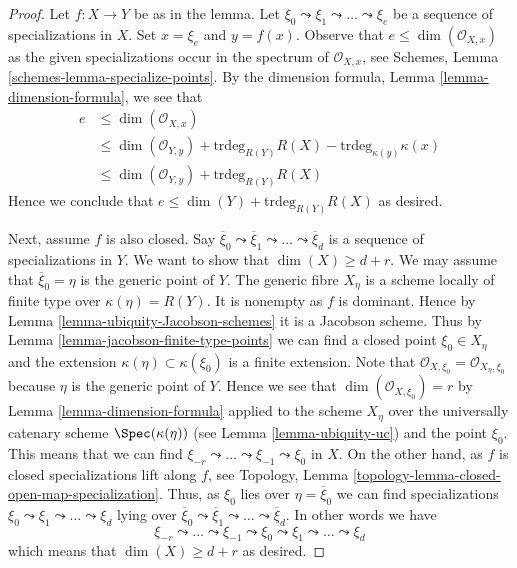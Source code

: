 \begin{proof}
Let $f : X \to Y$ be as in the lemma.
Let $\xi_0 \leadsto \xi_1 \leadsto \ldots \leadsto \xi_e$ be
a sequence of specializations in $X$. Set $x = \xi_e$
and $y = f(x)$. Observe that $e \leq \dim(\mathcal{O}_{X, x})$
as the given specializations occur in the spectrum of
$\mathcal{O}_{X, x}$, see Schemes, Lemma \ref{schemes-lemma-specialize-points}.
By the dimension formula, Lemma \ref{lemma-dimension-formula},
we see that
\begin{align*}
e & \leq \dim(\mathcal{O}_{X, x}) \\
& \leq \dim(\mathcal{O}_{Y, y}) +
\text{trdeg}_{R(Y)} R(X) - \text{trdeg}_{\kappa(y)} \kappa(x) \\
& \leq \dim(\mathcal{O}_{Y, y}) + \text{trdeg}_{R(Y)} R(X)
\end{align*}
Hence we conclude that $e \leq \dim(Y) + \text{trdeg}_{R(Y)} R(X)$ as desired.

\medskip\noindent
Next, assume $f$ is also closed.
Say $\overline{\xi}_0 \leadsto \overline{\xi}_1 \leadsto \ldots
\leadsto \overline{\xi}_d$ is a sequence of specializations in $Y$.
We want to show that $\dim(X) \geq d + r$.
We may assume that $\overline{\xi}_0 = \eta$ is the generic point of $Y$.
The generic fibre $X_\eta$ is a scheme locally of finite type over
$\kappa(\eta) = R(Y)$. It is nonempty as $f$ is dominant. Hence by
Lemma \ref{lemma-ubiquity-Jacobson-schemes} it is a Jacobson scheme.
Thus by Lemma \ref{lemma-jacobson-finite-type-points}
we can find a closed point $\xi_0 \in X_\eta$ and the extension
$\kappa(\eta) \subset \kappa(\xi_0)$ is
a finite extension. Note that
$\mathcal{O}_{X, \xi_0} = \mathcal{O}_{X_\eta, \xi_0}$ because
$\eta$ is the generic point of $Y$. Hence we see that
$\dim(\mathcal{O}_{X, \xi_0}) = r$ by Lemma \ref{lemma-dimension-formula}
applied to the scheme $X_\eta$ over the universally catenary
scheme $\Spec(\kappa(\eta))$ (see Lemma \ref{lemma-ubiquity-uc})
and the point $\xi_0$. This means that we can find
$\xi_{-r} \leadsto \ldots \leadsto \xi_{-1} \leadsto \xi_0$
in $X$. On the other hand, as $f$ is closed specializations
lift along $f$, see
Topology, Lemma \ref{topology-lemma-closed-open-map-specialization}.
Thus, as $\xi_0$ lies
over $\eta = \overline{\xi}_0$ we can
find specializations $\xi_0 \leadsto \xi_1 \leadsto \ldots \leadsto \xi_d$
lying over $\overline{\xi}_0 \leadsto \overline{\xi}_1 \leadsto \ldots
\leadsto \overline{\xi}_d$. In other words we have
$$
\xi_{-r} \leadsto \ldots \leadsto \xi_{-1} \leadsto \xi_0
\leadsto \xi_1 \leadsto \ldots \leadsto \xi_d
$$
which means that $\dim(X) \geq d + r$ as desired.
\end{proof}

